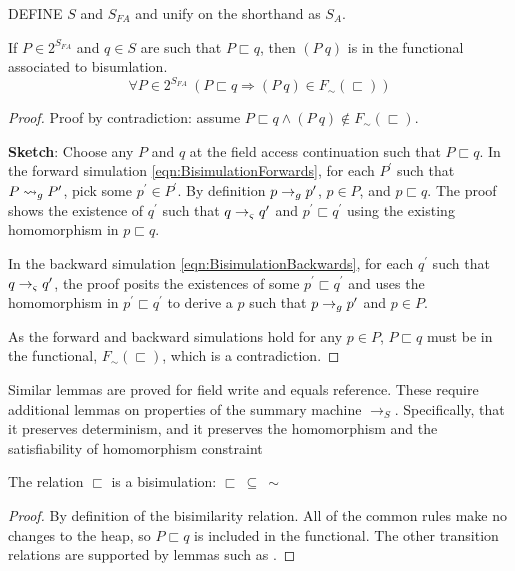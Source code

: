 DEFINE $S$ and $S_{FA}$ and unify on the shorthand as $S_A$. 
\begin{lemma}
If $P \in 2^{S_\mathit{FA}}$ and $q \in S$ are such that $P \sqsubset q$, then $(P\ q)$ is in the functional associated to bisumlation.
\label{lem:access}
$$
\forall P \in 2^{S_\mathit{FA}}\ (P \sqsubset q \Rightarrow (P\ q) \in F_\sim(\sqsubset))
$$
\end{lemma}

\begin{proof}
Proof by contradiction: assume $P \sqsubset q \wedge (P\ q) \not\in F_\sim(\sqsubset)$.

\noindent\textbf{Sketch}: Choose any $P$ and $q$ at the field access continuation such
that $P \sqsubset q$. In the forward simulation
\eqref{eqn:BisimulationForwards}, for each $P^\prime$ such that $P
\leadsto_{g} P^\prime$, pick some $p^\prime \in P^\prime$. By definition $p \rightarrow_{g}
p^\prime$, $p \in P$, and $p \sqsubset q$. The proof shows the
existence of $q^\prime$ such that $q \rightarrow_{\varsigma} q^\prime$ and $p^\prime
\sqsubset q^\prime$ using the existing homomorphism in $p \sqsubset q$.

In the backward simulation \eqref{eqn:BisimulationBackwards}, for each
$q^\prime$ such that $q \rightarrow_{\varsigma} q^\prime$, the proof posits the
existences of some $p^\prime \sqsubset q^\prime$ and uses the
homomorphism in $p^\prime \sqsubset q^\prime$ to derive a $p$ such
that $p \rightarrow_{g} p^\prime$ and $p \in P$.

As the forward and backward simulations hold for any $p \in P$, $P
\sqsubset q$ must be in the functional, $F_\sim(\sqsubset)$, which is
a contradiction.
\end{proof}
Similar lemmas are proved for field write and equals reference. These
require additional lemmas on properties of the summary machine
$\rightarrow_S$. Specifically, that it preserves determinism, and it
preserves the homomorphism and the satisfiability of homomorphism constraint 

\begin{theorem}
\label{th:bisim}
The relation $\sqsubset$ is a bisimulation: $\sqsubset\ \subseteq\ \sim$
\end{theorem}
\begin{proof}
By definition of the bisimilarity relation. All of the common rules
make no changes to the heap, so $P \sqsubset q$ is included in the
functional. The other transition relations are supported by lemmas
such as .
\end{proof}

